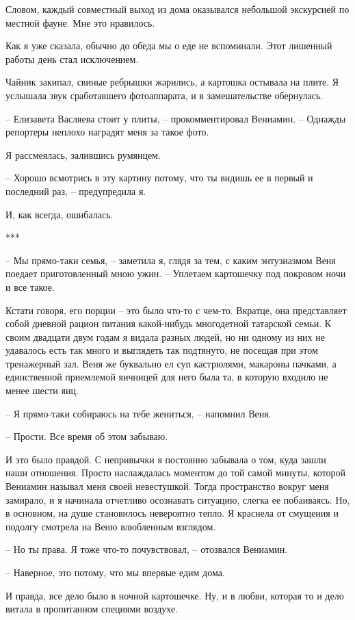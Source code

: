 \documentclass[
]{book}
\begin{document}
Словом, каждый совместный выход из дома оказывался небольшой экскурсией по местной фауне. Мне это нравилось.

Как я уже сказала, обычно до обеда мы о еде не вспоминали. Этот лишенный работы день стал исключением.

Чайник закипал, свиные ребрышки жарились, а картошка остывала на плите. Я услышала звук сработавшего фотоаппарата, и в замешательстве обернулась.

-- Елизавета Васляева стоит у плиты, -- прокомментировал Вениамин. -- Однажды репортеры неплохо наградят меня за такое фото.

Я рассмеялась, залившись румянцем.

-- Хорошо всмотрись в эту картину потому, что ты видишь ее в первый и последний раз, -- предупредила я.

И, как всегда, ошибалась.

***

-- Мы прямо-таки семья, -- заметила я, глядя за тем, с каким энтузиазмом Веня поедает приготовленный мною ужин. -- Уплетаем картошечку под покровом ночи и все такое.

Кстати говоря, его порции -- это было что-то с чем-то. Вкратце, она представляет собой дневной рацион питания какой-нибудь многодетной татарской семьи. К своим двадцати двум годам я видала разных людей, но ни одному из них не удавалось есть так много и выглядеть так подтянуто, не посещая при этом тренажерный зал. Веня же буквально ел суп кастрюлями, макароны пачками, а единственной приемлемой яичницей для него была та, в которую входило не менее шести яиц.

-- Я прямо-таки собираюсь на тебе жениться, -- напомнил Веня.

-- Прости. Все время об этом забываю.

И это было правдой. С непривычки я постоянно забывала о том, куда зашли наши отношения. Просто наслаждалась моментом до той самой минуты, которой Вениамин называл меня своей невестушкой. Тогда пространство вокруг меня замирало, и я начинала отчетливо осознавать ситуацию, слегка ее побаиваясь. Но, в основном, на душе становилось невероятно тепло. Я краснела от смущения и подолгу смотрела на Веню влюбленным взглядом.

-- Но ты права. Я тоже что-то почувствовал, -- отозвался Вениамин.

-- Наверное, это потому, что мы впервые едим дома.

И правда, все дело было в ночной картошечке. Ну, и в любви, которая то и дело витала в пропитанном специями воздухе.
\end{document}
